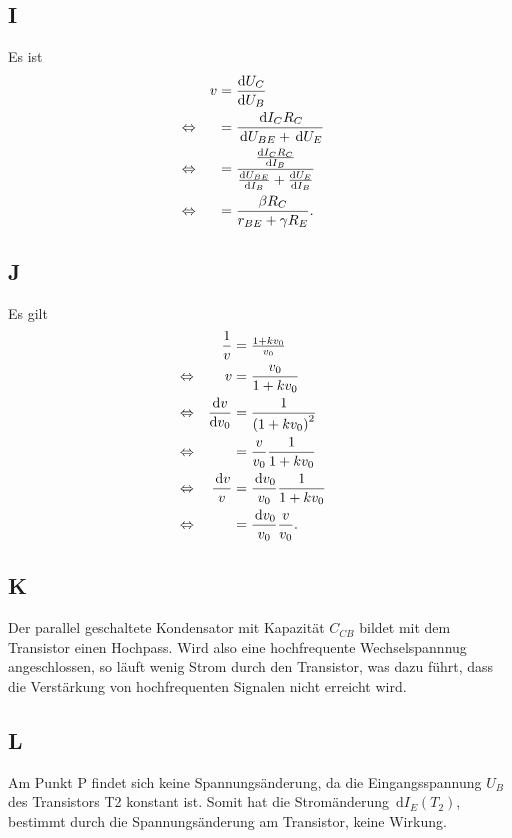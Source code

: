 \documentclass[a4paper,10pt]{article}
\newcommand{\td}{\,\text{d}}
\numberwithin{equation}{section}
\begin{document}
\subsection{I}
Es ist
\begin{align} 
        && v &= \diff[]{U_C}{U_B} &&\\
        \Leftrightarrow && &= \dfrac{\td I_CR_C}{\td U_{BE}+\td U_E} &&\nonumber \\
        \Leftrightarrow && &= \dfrac{\diff[]{I_CR_C}{I_B}}{\diff[]{U_{BE}}{I_B}+\diff[]{U_E}{I_B}} &&\nonumber \\
        \Leftrightarrow && &= \dfrac{\beta R_C}{r_{BE}+\gamma R_E}. &&
\end{align} 

\subsection{J}
Es gilt
\begin{align} 
        && \dfrac{1}{v} &= \tfrac{1+kv_0}{v_0} && \\
        \Leftrightarrow && v &= \dfrac{v_0}{1+kv_0} &&\nonumber \\
        \Leftrightarrow && \diff[]{v}{v_0} &= \dfrac{1}{\left(1+kv_0\right)^2} &&\nonumber \\
        \Leftrightarrow && &= \dfrac{v}{v_0}\dfrac{1}{1+kv_0} &&\nonumber \\
        \Leftrightarrow && \dfrac{\td v}{v} &= \dfrac{\td v_0}{v_0}\dfrac{1}{1+kv_0}&&\nonumber \\
        \Leftrightarrow && &= \dfrac{\td v_0}{v_0}\dfrac{v}{v_0}. &&
\end{align} 

\subsection{K}
Der parallel geschaltete Kondensator mit Kapazität $C_{CB}$ bildet mit dem Transistor einen Hochpass.
Wird also eine hochfrequente Wechselspannnug angeschlossen, so läuft wenig Strom durch den Transistor, was dazu führt, dass die Verstärkung von hochfrequenten Signalen nicht erreicht wird.

\subsection{L}
Am Punkt P findet sich keine Spannungsänderung, da die Eingangsspannung $U_B$ des Transistors T2 konstant ist.
Somit hat die Stromänderung $\td I_E\left(T_2\right)$, bestimmt durch die Spannungsänderung am Transistor, keine Wirkung.
\end{document}

